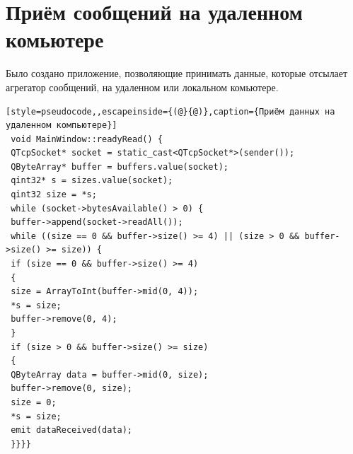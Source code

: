  \section{Приём сообщений на удаленном комьютере}
 Было создано приложение, позволяющие принимать данные, которые отсылает агрегатор сообщений, на удаленном или локальном комьютере.
 \begin{lstlisting}[style=pseudocode,,escapeinside={(@}{@)},caption={Приём данных на удаленном компьютере}] 
 void MainWindow::readyRead() {
 QTcpSocket* socket = static_cast<QTcpSocket*>(sender());
 QByteArray* buffer = buffers.value(socket);
 qint32* s = sizes.value(socket);
 qint32 size = *s;
 while (socket->bytesAvailable() > 0) {
 buffer->append(socket->readAll());
 while ((size == 0 && buffer->size() >= 4) || (size > 0 && buffer->size() >= size)) {
 if (size == 0 && buffer->size() >= 4) 
 {
 size = ArrayToInt(buffer->mid(0, 4));
 *s = size;
 buffer->remove(0, 4);
 }
 if (size > 0 && buffer->size() >= size) 
 {
 QByteArray data = buffer->mid(0, size);
 buffer->remove(0, size);
 size = 0;
 *s = size;
 emit dataReceived(data);
 }}}}
  \end{lstlisting}


